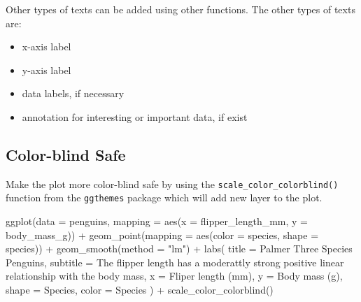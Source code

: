 \documentclass[
  letterpaper,
  DIV=11,
  numbers=noendperiod]{scrreprt}
\newenvironment{Shaded}{\begin{snugshade}}{\end{snugshade}}
\newcommand{\AttributeTok}[1]{\textcolor[rgb]{0.40,0.45,0.13}{#1}}
\newcommand{\FunctionTok}[1]{\textcolor[rgb]{0.28,0.35,0.67}{#1}}
\newcommand{\NormalTok}[1]{\textcolor[rgb]{0.00,0.23,0.31}{#1}}
\newcommand{\SpecialCharTok}[1]{\textcolor[rgb]{0.37,0.37,0.37}{#1}}
\newcommand{\StringTok}[1]{\textcolor[rgb]{0.13,0.47,0.30}{#1}}
\providecommand{\tightlist}{%
  \setlength{\itemsep}{0pt}\setlength{\parskip}{0pt}}\usepackage{longtable,booktabs,array}
\begin{document}
Other types of texts can be added using other functions. The other types
of texts are:

\begin{itemize}
\tightlist
\item
  x-axis label
\item
  y-axis label
\item
  data labels, if necessary
\item
  annotation for interesting or important data, if exist
\end{itemize}

\subsection{Color-blind Safe}\label{color-blind-safe}

Make the plot more color-blind safe by using the
\texttt{scale\_color\_colorblind()} function from the \texttt{ggthemes}
package which will add new layer to the plot.

\begin{Shaded}
\begin{Highlighting}[]
\FunctionTok{ggplot}\NormalTok{(}\AttributeTok{data =}\NormalTok{ penguins,}
       \AttributeTok{mapping =} \FunctionTok{aes}\NormalTok{(}\AttributeTok{x =}\NormalTok{ flipper\_length\_mm, }\AttributeTok{y =}\NormalTok{ body\_mass\_g)) }\SpecialCharTok{+}
  \FunctionTok{geom\_point}\NormalTok{(}\AttributeTok{mapping =} \FunctionTok{aes}\NormalTok{(}\AttributeTok{color =}\NormalTok{ species, }\AttributeTok{shape =}\NormalTok{ species)) }\SpecialCharTok{+}
  \FunctionTok{geom\_smooth}\NormalTok{(}\AttributeTok{method =} \StringTok{"lm"}\NormalTok{) }\SpecialCharTok{+}
  \FunctionTok{labs}\NormalTok{(}
    \AttributeTok{title =} \StringTok{\textquotesingle{}Palmer Three Species Penguins\textquotesingle{}}\NormalTok{,}
    \AttributeTok{subtitle =} \StringTok{\textquotesingle{}The flipper length has a moderattly strong positive linear relationship with the body mass\textquotesingle{}}\NormalTok{,}
    \AttributeTok{x =} \StringTok{\textquotesingle{}Fliper length (mm)\textquotesingle{}}\NormalTok{,}
    \AttributeTok{y =} \StringTok{\textquotesingle{}Body mass (g)\textquotesingle{}}\NormalTok{,}
    \AttributeTok{shape =} \StringTok{\textquotesingle{}Species\textquotesingle{}}\NormalTok{,}
    \AttributeTok{color =} \StringTok{\textquotesingle{}Species\textquotesingle{}}
\NormalTok{  ) }\SpecialCharTok{+}
  \FunctionTok{scale\_color\_colorblind}\NormalTok{()}
\end{Highlighting}
\end{Shaded}
\end{document}
